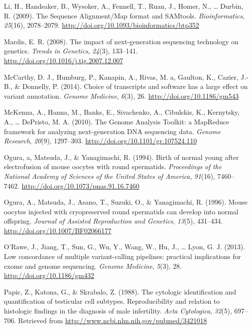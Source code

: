 \documentclass[12pt,twoside]{reedthesis}
\theoremstyle{definition}
\theoremstyle{definition}
\theoremstyle{remark}
\begin{document}
  \hypertarget{ref-Li2009}{}
  Li, H., Handsaker, B., Wysoker, A., Fennell, T., Ruan, J., Homer, N.,
  \ldots{} Durbin, R. (2009). The Sequence Alignment/Map format and
  SAMtools. \emph{Bioinformatics}, \emph{25}(16), 2078--2079.
  \url{http://doi.org/10.1093/bioinformatics/btp352}
  
  \hypertarget{ref-Mardis2008}{}
  Mardis, E. R. (2008). The impact of next-generation sequencing
  technology on genetics. \emph{Trends in Genetics}, \emph{24}(3),
  133--141. \url{http://doi.org/10.1016/j.tig.2007.12.007}
  
  \hypertarget{ref-McCarthy2014}{}
  McCarthy, D. J., Humburg, P., Kanapin, A., Rivas, M. a, Gaulton, K.,
  Cazier, J.-B., \& Donnelly, P. (2014). Choice of transcripts and
  software has a large effect on variant annotation. \emph{Genome
  Medicine}, \emph{6}(3), 26. \url{http://doi.org/10.1186/gm543}
  
  \hypertarget{ref-McKenna2010}{}
  McKenna, A., Hanna, M., Banks, E., Sivachenko, A., Cibulskis, K.,
  Kernytsky, A., \ldots{} DePristo, M. A. (2010). The Genome Analysis
  Toolkit: a MapReduce framework for analyzing next-generation DNA
  sequencing data. \emph{Genome Research}, \emph{20}(9), 1297--303.
  \url{http://doi.org/10.1101/gr.107524.110}
  
  \hypertarget{ref-Ogura1994}{}
  Ogura, a, Matsuda, J., \& Yanagimachi, R. (1994). Birth of normal young
  after electrofusion of mouse oocytes with round spermatids.
  \emph{Proceedings of the National Academy of Sciences of the United
  States of America}, \emph{91}(16), 7460--7462.
  \url{http://doi.org/10.1073/pnas.91.16.7460}
  
  \hypertarget{ref-Kimura1995}{}
  Ogura, A., Matsuda, J., Asano, T., Suzuki, O., \& Yanagimachi, R.
  (1996). Mouse oocytes injected with cryopreserved round spermatids can
  develop into normal offspring. \emph{Journal of Assisted Reproduction
  and Genetics}, \emph{13}(5), 431--434.
  \url{http://doi.org/10.1007/BF02066177}
  
  \hypertarget{ref-ORawe2013}{}
  O'Rawe, J., Jiang, T., Sun, G., Wu, Y., Wang, W., Hu, J., \ldots{} Lyon,
  G. J. (2013). Low concordance of multiple variant-calling pipelines:
  practical implications for exome and genome sequencing. \emph{Genome
  Medicine}, \emph{5}(3), 28. \url{http://doi.org/10.1186/gm432}
  
  \hypertarget{ref-Papic}{}
  Papic, Z., Katona, G., \& Skrabalo, Z. (1988). The cytologic
  identification and quantification of testicular cell subtypes.
  Reproducibility and relation to histologic findings in the diagnosis of
  male infertility. \emph{Acta Cytologica}, \emph{32}(5), 697--706.
  Retrieved from \url{http://www.ncbi.nlm.nih.gov/pubmed/3421018}
  
\end{document}

